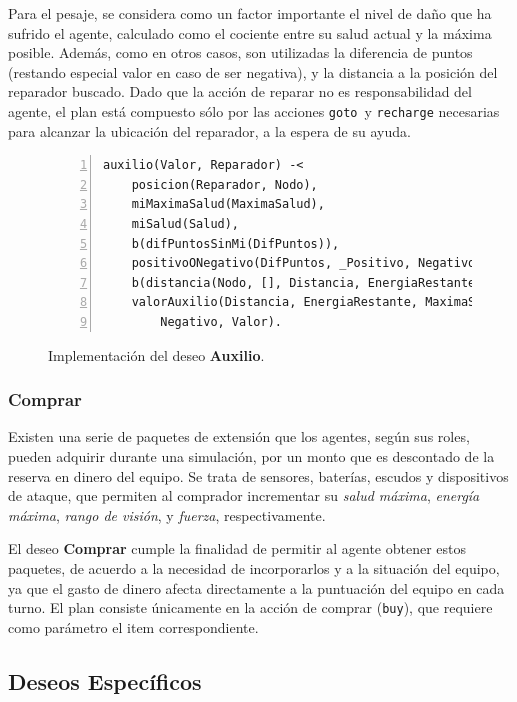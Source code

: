 \documentclass[oneside]{book}
\theoremstyle{definition}
\begin{document}
Para el pesaje, se considera como un factor importante el nivel de daño que ha sufrido 
el agente, calculado como el cociente entre su salud actual y la máxima posible. 
Además, como en otros casos, son utilizadas la diferencia de puntos (restando especial
valor en caso de ser negativa), y la distancia a la posición del reparador buscado. Dado que 
la acción de reparar no es responsabilidad del agente, el plan está compuesto sólo por las
acciones \texttt{goto}\ y \texttt{recharge} necesarias para alcanzar la ubicación del 
reparador, a la espera de su ayuda.

\begin{figure}
\begin{Verbatim}[numbers=left]
auxilio(Valor, Reparador) -<
    posicion(Reparador, Nodo),
    miMaximaSalud(MaximaSalud),
    miSalud(Salud),
    b(difPuntosSinMi(DifPuntos)),
    positivoONegativo(DifPuntos, _Positivo, Negativo),
    b(distancia(Nodo, [], Distancia, EnergiaRestante)),
    valorAuxilio(Distancia, EnergiaRestante, MaximaSalud, Salud, 
        Negativo, Valor).  	
\end{Verbatim}
\caption{Implementación del deseo \textbf{Auxilio}.}
\label{fig:deseoAuxilio}
\end{figure}	



	
\subsubsection{Comprar}

Existen una serie de paquetes de extensión que los agentes, según sus roles, pueden 
adquirir durante una simulación, por un monto que es descontado de la reserva en dinero
del equipo. Se trata de sensores, baterías, escudos y dispositivos de ataque, que permiten 
al comprador incrementar su \textit{salud máxima}, \textit{energía máxima}, 
\textit{rango de visión}, y \textit{fuerza}, respectivamente.

El deseo \textbf{Comprar} cumple la finalidad de permitir al agente obtener estos paquetes,
de acuerdo a la necesidad de incorporarlos y a la situación del equipo, ya que el gasto 
de dinero afecta directamente a la puntuación del equipo en cada turno. El plan consiste 
únicamente en la acción de comprar (\texttt{buy}), que requiere como parámetro el item 
correspondiente.		
	
\subsection{Deseos Específicos}
\end{document}
